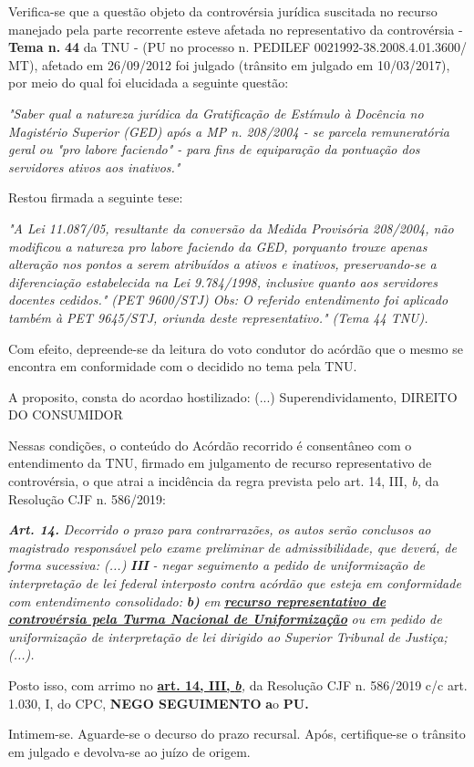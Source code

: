 \documentclass[12pt]{article}
\begin{document}
\justifying
\noindent Verifica-se que a questão objeto da controvérsia jurídica suscitada no recurso manejado pela parte recorrente esteve afetada no representativo da controvérsia - \textbf{Tema n. }\textbf{44} da TNU - (PU no processo n. PEDILEF 0021992-38.2008.4.01.3600/ MT),  afetado em 26/09/2012 foi julgado (trânsito em julgado em 10/03/2017), por meio do qual foi elucidada a seguinte questão:

\noindent \textit{"Saber qual a natureza jurídica da Gratificação de Estímulo à Docência no Magistério Superior (GED) após a MP n. 208/2004 - se parcela remuneratória geral ou "pro labore faciendo" - para fins de equiparação da pontuação dos servidores ativos aos inativos."}

\noindent Restou firmada a seguinte tese:

\noindent \textit{"A Lei 11.087/05, resultante da conversão da Medida Provisória 208/2004, não modificou a natureza pro labore faciendo da GED, porquanto trouxe apenas alteração nos pontos a serem atribuídos a ativos e inativos, preservando-se a diferenciação estabelecida na Lei 9.784/1998, inclusive quanto aos servidores docentes cedidos." (PET 9600/STJ) Obs: O referido entendimento foi aplicado também à PET 9645/STJ, oriunda deste representativo." (Tema 44 TNU).}

\noindent Com efeito, depreende-se da leitura do voto condutor do acórdão que o mesmo se encontra em conformidade com o decidido no  tema pela TNU.

\noindent A proposito, consta do acordao hostilizado: (...) Superendividamento, DIREITO DO CONSUMIDOR

\noindent Nessas condições, o conteúdo do Acórdão recorrido é consentâneo com o entendimento da TNU, firmado em julgamento de recurso representativo de controvérsia, o que atrai a incidência da regra prevista pelo art. 14, III, \textit{b,} da Resolução CJF n. 586/2019:

\noindent \textit{\textbf{Art. 14.}}\textit{ Decorrido o prazo para contrarrazões, os autos serão conclusos ao magistrado responsável pelo exame preliminar de admissibilidade, que deverá, de forma sucessiva: (...) }\textit{\textbf{III }}\textit{- negar seguimento a pedido de uniformização de interpretação de lei federal interposto contra acórdão que esteja em conformidade com entendimento consolidado: }\textit{\textbf{b)}}\textit{ em }\uline{\textit{\textbf{recurso representativo de controvérsia pela Turma Nacional de Uniformização}}}\textit{ ou em pedido de uniformização de interpretação de lei dirigido ao Superior Tribunal de Justiça;(...).}

\noindent Posto isso, com arrimo no \uline{\textbf{art. 14, III, }}\uline{\textit{\textbf{b}}}\textit{,} da Resolução CJF n. 586/2019 c/c art. 1.030, I, do CPC, \textbf{NEGO SEGUIMENTO }\textbf{a}o\textbf{ PU}\textbf{.}

\noindent Intimem-se. Aguarde-se o decurso do prazo recursal. Após, certifique-se o trânsito em julgado e devolva-se ao juízo de origem.
\end{document}
